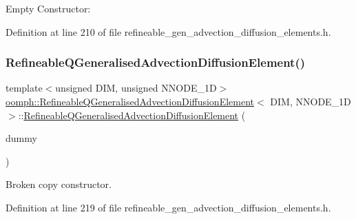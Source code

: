 Empty Constructor\+: 



Definition at line 210 of file refineable\+\_\+gen\+\_\+advection\+\_\+diffusion\+\_\+elements.\+h.

\mbox{\label{classoomph_1_1RefineableQGeneralisedAdvectionDiffusionElement_a19c7bc58ef5c41d6416d3e903938ac39}} 
\subsubsection{\texorpdfstring{Refineable\+Q\+Generalised\+Advection\+Diffusion\+Element()}{RefineableQGeneralisedAdvectionDiffusionElement()}\hspace{0.1cm}{\footnotesize\ttfamily [2/2]}}
{\footnotesize\ttfamily template$<$unsigned D\+IM, unsigned N\+N\+O\+D\+E\+\_\+1D$>$ \\
\hyperlink{classoomph_1_1RefineableQGeneralisedAdvectionDiffusionElement}{oomph\+::\+Refineable\+Q\+Generalised\+Advection\+Diffusion\+Element}$<$ D\+IM, N\+N\+O\+D\+E\+\_\+1D $>$\+::\hyperlink{classoomph_1_1RefineableQGeneralisedAdvectionDiffusionElement}{Refineable\+Q\+Generalised\+Advection\+Diffusion\+Element} (\begin{DoxyParamCaption}\item[{const \hyperlink{classoomph_1_1RefineableQGeneralisedAdvectionDiffusionElement}{Refineable\+Q\+Generalised\+Advection\+Diffusion\+Element}$<$ D\+IM, N\+N\+O\+D\+E\+\_\+1D $>$ \&}]{dummy }\end{DoxyParamCaption})\hspace{0.3cm}{\ttfamily [inline]}}



Broken copy constructor. 



Definition at line 219 of file refineable\+\_\+gen\+\_\+advection\+\_\+diffusion\+\_\+elements.\+h.



